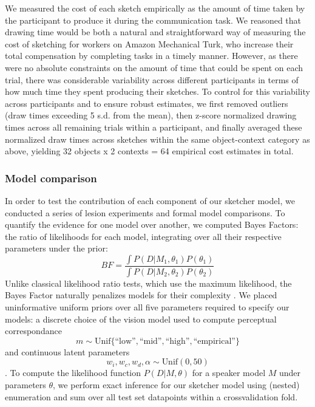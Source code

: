 \documentclass[9pt,twocolumn,twoside]{pnas-new}
\begin{document}
{We measured the cost of each sketch empirically as the amount of time taken by the participant to produce it during the communication task. We reasoned that drawing time would be both a natural and straightforward way of measuring the cost of sketching for workers on Amazon Mechanical Turk, who increase their total compensation by completing tasks in a timely manner. However, as there were no absolute constraints on the amount of time that could be spent on each trial, there was considerable variability across different participants in terms of how much time they spent producing their sketches. To control for this variability across participants and to ensure robust estimates, we first removed outliers (draw times exceeding 5 s.d. from the mean), then z-score normalized drawing times across all remaining trials within a participant, and finally averaged these normalized draw times across sketches within the same object-context category as above, yielding 32 objects x 2 contexts = 64 empirical cost estimates in total.

\subsubsection*{Model comparison}

In order to test the contribution of each component of our sketcher model, we conducted a series of lesion experiments and formal model comparisons.
To quantify the evidence for one model over another, we computed Bayes Factors:
the ratio of likelihoods for each model, integrating over all their respective parameters under the prior:
$$BF = \frac{\int P(D | M_1, \theta_1)P(\theta_1)}{\int P(D | M_2, \theta_2)P(\theta_2)}$$
Unlike classical likelihood ratio tests, which use the maximum likelihood, the Bayes Factor naturally penalizes models for their complexity \cite{wagenmakers2018bayesian,jefferys1992ockham}.
We placed uninformative uniform priors over all five parameters required to specify our models: a discrete choice of the vision model used to compute perceptual correspondance
$$m \sim \textrm{Unif}\{\textrm{``low''}, \textrm{``mid''}, \textrm{``high''}, \textrm{``empirical''}\}$$
and continuous latent parameters
$$w_i, w_c, w_d, \alpha \sim \textrm{Unif}(0, 50)$$. 
To compute the likelihood function $P(D | M, \theta)$ for a speaker model $M$ under parameters $\theta$, we perform exact inference for our sketcher model using (nested) enumeration and sum over all test set datapoints within a crossvalidation fold. 

}
\end{document}
